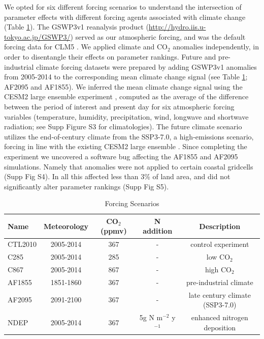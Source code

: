 \documentclass[draft]{agujournal2019}
\begin{document}
 We opted for six different forcing scenarios to understand the intersection of parameter effects with different forcing agents associated with climate change (Table \ref{tab:exps}). The GSWP3v1 reanalysis product (\url{http://hydro.iis.u-tokyo.ac.jp/GSWP3/}) served as our atmospheric forcing, and was the default forcing data for CLM5 \cite{lawrence2019}. We applied climate and CO$_2$ anomalies independently, in order to disentangle their effects on parameter rankings. Future and pre-industrial climate forcing datasets were prepared by adding GSWP3v1 anomalies from 2005-2014 to the corresponding mean climate change signal (see Table \ref{tab:exps}; AF2095 and AF1855). We inferred the mean climate change signal using the CESM2 large ensemble experiment \cite{rodgers2021}, computed as the average of the difference between the period of interest and present day for six atmospheric forcing variables (temperature, humidity, precipitation, wind, longwave and shortwave radiation; see Supp Figure S3 for climatologies). The future climate scenario utilizes the end-of-century climate from the SSP3-7.0, a high-emissions scenario, forcing in line with the existing CESM2 large ensemble \cite{rodgers2021}. Since completing the experiment we uncovered a software bug affecting the AF1855 and AF2095 simulations. Namely that anomalies were not applied to certain coastal gridcells (Supp Fig S4). In all this affected less than 3\% of land area, and did not significantly alter parameter rankings (Supp Fig S5).  


 

\label{sect:exps}
 \begin{table}[h]
 \caption{Forcing Scenarios}
 \centering
 \begin{tabular}{l c c c c}
 \hline
  Name  & Meteorology & CO$_2$ (ppmv) & N addition & Description \\
 \hline
   CTL2010  & 2005-2014 & 367 & - & control experiment\\
   C285        & 2005-2014 & 285 & - & low CO$_2$ \\
   C867        & 2005-2014 & 867 & - & high CO$_2$ \\
   AF1855    & 1851-1860 & 367 & - & pre-industrial climate \\
   AF2095    & 2091-2100 & 367 & - & late century climate (SSP3-7.0) \\
   NDEP      & 2005-2014 & 367 & 5g N m$^{-2}$  y$^{-1}$ & enhanced nitrogen deposition \\
 \hline
 \end{tabular}
 \label{tab:exps}
 \end{table}
\end{document}
